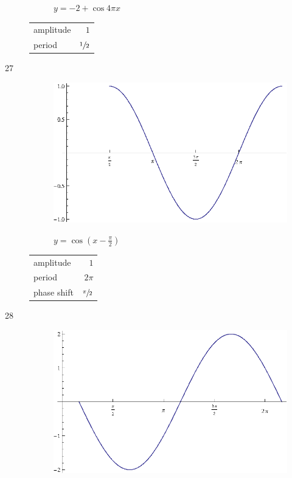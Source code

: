 \documentclass{exam}
\begin{document}
\begin{description}
\begin{figure}[H]
          $y = -2 + \cos 4 \pi x$
        \end{figure}

        \begin{tabular}[H]{lr}
          \toprule
          amplitude & $1$ \\
          period    & $\sfrac{1}{2}$ \\
          \bottomrule
        \end{tabular}

      \item[27]
        \begin{figure}[H]
          \centering
          \includegraphics[scale=0.8]{exercise27.eps}

          $y = \cos \left( x - \frac{\pi}{2} \right)$
        \end{figure}

        \begin{tabular}[H]{lr}
          \toprule
          amplitude   & $1$ \\
          period      & $2 \pi$ \\
          phase shift & $\sfrac{\pi}{2}$ \\
          \bottomrule
        \end{tabular}

      \item[28]
        \begin{figure}[H]
          \centering
          \includegraphics[scale=0.8]{exercise28.eps}


\end{figure}
\end{description}
\end{document}
